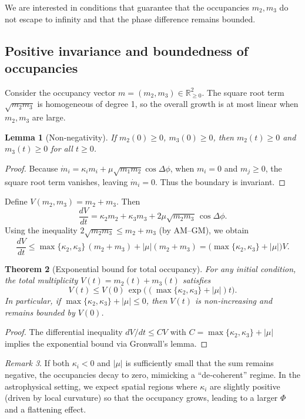 \documentclass[11pt,a4paper]{article}
\newtheorem{theorem}{Theorem}[section]
\newtheorem{lemma}[theorem]{Lemma}
\theoremstyle{definition}
\theoremstyle{remark}
\newtheorem{remark}[theorem]{Remark}
\newcommand{\R}{\mathbb{R}}
\begin{document}
We are interested in conditions that guarantee that the occupancies \(m_2,m_3\) do not escape to infinity and that the phase difference remains bounded.

\subsection{Positive invariance and boundedness of occupancies}
Consider the occupancy vector \(m=(m_2,m_3)\in\R_{\ge 0}^2\).  
The square root term \(\sqrt{m_2 m_3}\) is homogeneous of degree 1, so the overall growth is at most linear when \(m_2,m_3\) are large.

\begin{lemma}[Non‑negativity]
If \(m_2(0)\ge 0\), \(m_3(0)\ge 0\), then \(m_2(t)\ge 0\) and \(m_3(t)\ge 0\) for all \(t\ge 0\).
\end{lemma}
\begin{proof}
Because \(\dot m_i = \kappa_i m_i + \mu\sqrt{m_1 m_2}\cos\Delta\phi\), when \(m_i=0\) and \(m_j\ge0\), the square root term vanishes, leaving \(\dot m_i = 0\).  
Thus the boundary is invariant.
\end{proof}

Define \(V(m_2,m_3)=m_2+m_3\).  Then
\[
\frac{dV}{dt} = \kappa_2 m_2 + \kappa_3 m_3 + 2\mu\sqrt{m_2 m_3}\,\cos\Delta\phi.
\]
Using the inequality \(2\sqrt{m_2 m_3}\le m_2+m_3\) (by AM–GM), we obtain
\[
\frac{dV}{dt} \le \max\{\kappa_2,\kappa_3\}\,(m_2+m_3) + |\mu| (m_2+m_3) = \bigl(\max\{\kappa_2,\kappa_3\}+|\mu|\bigr) V.
\]

\begin{theorem}[Exponential bound for total occupancy]
For any initial condition, the total multiplicity \(V(t)=m_2(t)+m_3(t)\) satisfies
\[
V(t) \le V(0)\,\exp\!\bigl((\max\{\kappa_2,\kappa_3\}+|\mu|)t\bigr).
\]
In particular, if \(\max\{\kappa_2,\kappa_3\}+|\mu| \le 0\), then \(V(t)\) is non‑increasing and remains bounded by \(V(0)\).
\end{theorem}
\begin{proof}
The differential inequality \(dV/dt \le C V\) with \(C=\max\{\kappa_2,\kappa_3\}+|\mu|\) implies the exponential bound via Gronwall’s lemma.
\end{proof}

\begin{remark}
If both \(\kappa_i<0\) and \(|\mu|\) is sufficiently small that the sum remains negative, the occupancies decay to zero, mimicking a ``de‑coherent'' regime.  
In the astrophysical setting, we expect spatial regions where \(\kappa_i\) are slightly positive (driven by local curvature) so that the occupancy grows, leading to a larger \(\Phi\) and a flattening effect.
\end{remark}
\end{document}
